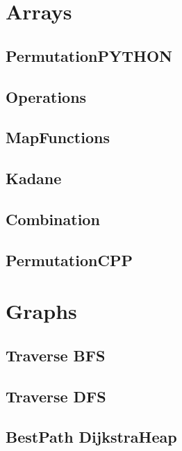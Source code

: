 \section{Arrays}
\subsection{ PermutationPYTHON}
\raggedbottom
\hrulefill
\subsection{ Operations}
\raggedbottom
\hrulefill
\subsection{ MapFunctions}
\raggedbottom
\hrulefill
\subsection{ Kadane}
\raggedbottom
\hrulefill
\subsection{ Combination}
\raggedbottom
\hrulefill
\subsection{ PermutationCPP}
\raggedbottom
\hrulefill

\section{Graphs}
\subsection{Traverse BFS}
\raggedbottom
\hrulefill
\subsection{Traverse DFS}
\raggedbottom
\hrulefill
\subsection{BestPath DijkstraHeap}
\raggedbottom
\hrulefill
